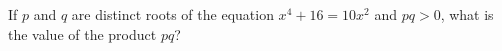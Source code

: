 If $p$ and $q$ are distinct roots of the equation $x^4+16=10x^2$ and $pq>0$, what is the value of the product $pq$?
